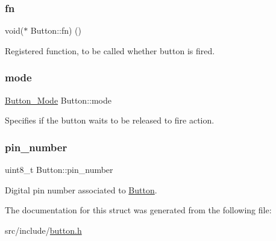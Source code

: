 \subsubsection{\texorpdfstring{fn}{fn}}
{\footnotesize\ttfamily void($\ast$ Button\+::fn) ()}



Registered function, to be called whether button is fired. 

\mbox{\label{structButton_aef2b69645163f24a3c019f6695f08843}} 
\subsubsection{\texorpdfstring{mode}{mode}}
{\footnotesize\ttfamily \mbox{\hyperlink{button_8h_a9a185102e3c0ad41aac006e0e2fcb190}{Button\+\_\+\+Mode}} Button\+::mode}



Specifies if the button waits to be released to fire action. 

\mbox{\label{structButton_af928b8cec60e2319e1a624edd40c878d}} 
\subsubsection{\texorpdfstring{pin\+\_\+number}{pin\_number}}
{\footnotesize\ttfamily uint8\+\_\+t Button\+::pin\+\_\+number}



Digital pin number associated to \mbox{\hyperlink{structButton}{Button}}. 



The documentation for this struct was generated from the following file\+:\begin{DoxyCompactItemize}
\item 
src/include/\mbox{\hyperlink{button_8h}{button.\+h}}\end{DoxyCompactItemize}
